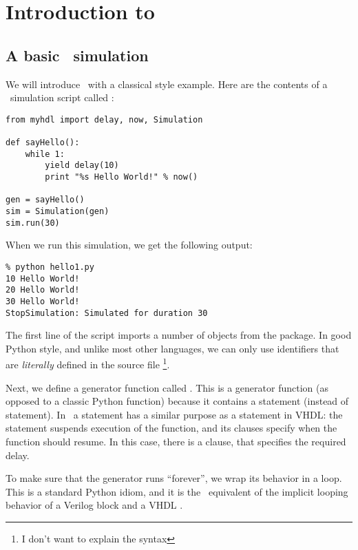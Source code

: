 \chapter{Introduction to \myhdl\ }

\section{A basic \myhdl\ simulation}

We will introduce \myhdl\ with a classical  style
example. Here are the contents of a \myhdl\ simulation script called
:

\begin{verbatim}
from myhdl import delay, now, Simulation

def sayHello():
    while 1:
        yield delay(10)
        print "%s Hello World!" % now()

gen = sayHello()
sim = Simulation(gen)
sim.run(30)

\end{verbatim}

When we run this simulation, we get the following output: 

\begin{verbatim}
% python hello1.py
10 Hello World!
20 Hello World!
30 Hello World!
StopSimulation: Simulated for duration 30

\end{verbatim}

The first line of the script imports a
number of objects from the  package. In good Python style, and
unlike most other languages, we can only use identifiers that are
\emph{literally} defined in the source file \footnote{I don't want to
explain the  syntax}. 

Next, we define a generator function called
. This is a generator function (as opposed to
a classic Python function) because it contains a 
statement (instead of  statement). In \myhdl\, a
 statement has a similar purpose as a 
statement in VHDL: the statement suspends execution of the function,
and its clauses specify when the function should resume. In this case,
there is a  clause, that specifies the required delay.

To make sure that the generator runs ``forever'', we wrap its behavior
in a  loop. This is a standard Python idiom, and it is
the \myhdl\ equivalent of the implicit looping behavior of a Verilog
 block and a VHDL .

